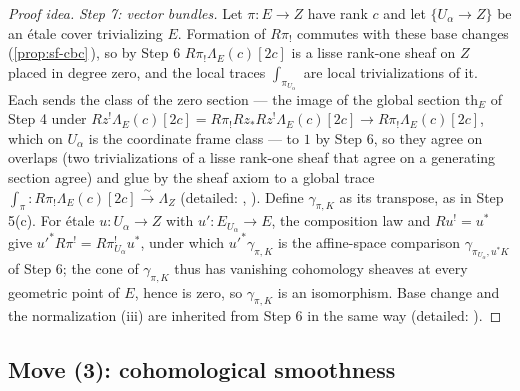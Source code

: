 \documentclass[11pt]{article}
\theoremstyle{plain}
\theoremstyle{definition}
\newcommand{\Cref}[1]{\hyperref[#1]{\ref{#1}}\,\hyperref[#1]{\nameref*{#1}}}
\begin{document}
\begin{proof}[Proof idea]
\emph{Step 7: vector bundles.}  Let $\pi:E\to Z$ have rank $c$ and let
$\{U_\alpha\to Z\}$ be an \'etale cover trivializing $E$.  Formation of
$R\pi_!$ commutes with these base changes (\Cref{prop:sf-cbc}), so by Step 6
$R\pi_!\Lambda_E(c)[2c]$ is a lisse rank-one sheaf on $Z$ placed in degree
zero, and the local traces $\int_{\pi_{U_\alpha}}$ are local trivializations
of it.  Each sends the class of the zero section --- the image of the global
section $\mathrm{th}_E$ of Step 4 under
$Rz^{!}\Lambda_E(c)[2c]=R\pi_!Rz_*Rz^{!}\Lambda_E(c)[2c]\to R\pi_!\Lambda_E(c)[2c]$,
which on $U_\alpha$ is the coordinate frame class --- to $1$ by Step 6, so
they agree on overlaps (two trivializations of a lisse rank-one sheaf that
agree on a generating section agree) and glue by the sheaf axiom to a global
trace $\int_\pi:R\pi_!\Lambda_E(c)[2c]\xrightarrow{\sim}\Lambda_Z$ (detailed:
, ).
Define $\gamma_{\pi,K}$ as its transpose, as in Step 5(c).  For \'etale
$u:U_\alpha\to Z$ with $u':E_{U_\alpha}\to E$, the composition law and
$Ru^{!}=u^{*}$ give $u'^{*}R\pi^{!}=R\pi_{U_\alpha}^{!}u^{*}$, under which
$u'^{*}\gamma_{\pi,K}$ is the affine-space comparison
$\gamma_{\pi_{U_\alpha},u^{*}K}$ of Step 6; the cone of $\gamma_{\pi,K}$ thus
has vanishing cohomology sheaves at every geometric point of $E$, hence is
zero, so $\gamma_{\pi,K}$ is an isomorphism.  Base change and the
normalization (iii) are inherited from Step 6 in the same way (detailed:
).
\end{proof}

\subsection{Move (3): cohomological smoothness}
\end{document}
